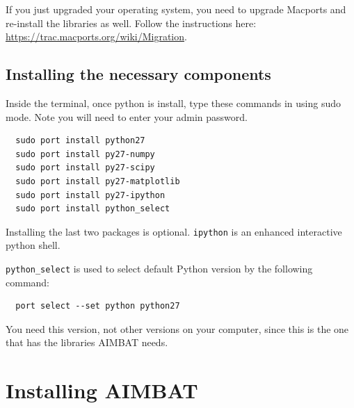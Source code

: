\documentclass[letterpaper,10pt]{article}
\begin{document}
If you just upgraded your operating system, you need to upgrade Macports and re-install the libraries as well. Follow the instructions here: \url{https://trac.macports.org/wiki/Migration}.


\subsection{Installing the necessary components}

Inside the terminal, once python is install, type these commands in using sudo mode. Note you will need to enter your admin password.

\begin{verbatim}
  sudo port install python27
  sudo port install py27-numpy
  sudo port install py27-scipy
  sudo port install py27-matplotlib
  sudo port install py27-ipython
  sudo port install python_select
\end{verbatim}

Installing the last two packages is optional. \verb"ipython" is an enhanced interactive python shell.

\verb"python_select" is used to select default Python version by the following command:

\begin{verbatim}
  port select --set python python27
\end{verbatim}

You need this version, not other versions on your computer, since this is the one that has the libraries AIMBAT needs.





\section{Installing AIMBAT}
\end{document}
